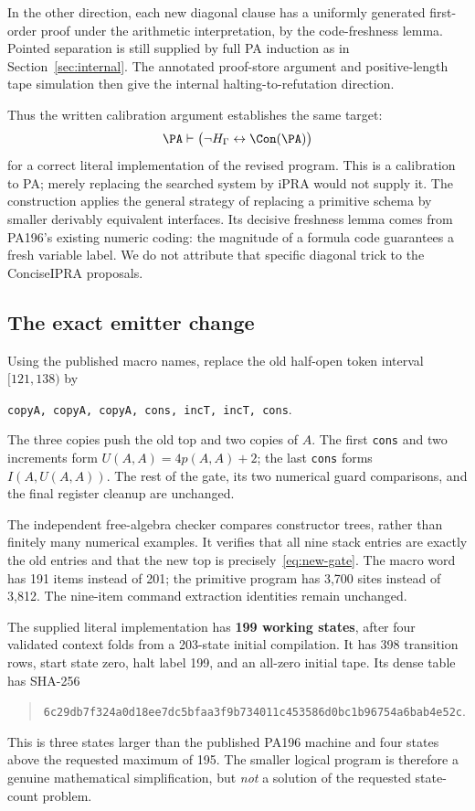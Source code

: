 In the other direction, each new diagonal clause has a uniformly generated first-order proof under the arithmetic interpretation, by the code-freshness lemma. Pointed separation is still supplied by full PA induction as in Section~\ref{sec:internal}. The annotated proof-store argument and positive-length tape simulation then give the internal halting-to-refutation direction.

Thus the written calibration argument establishes the same target:
\[
 \PA\vdash\bigl(\neg H_{\Gamma}\leftrightarrow\Con(\PA)\bigr)
\]
for a correct literal implementation of the revised program. This is a calibration to PA; merely replacing the searched system by iPRA would not supply it. The construction applies the general strategy of replacing a primitive schema by smaller derivably equivalent interfaces. Its decisive freshness lemma comes from PA196's existing numeric coding: the magnitude of a formula code guarantees a fresh variable label. We do not attribute that specific diagonal trick to the ConciseIPRA proposals.

\subsection{The exact emitter change}
Using the published macro names, replace the old half-open token interval \([121,138)\) by
\begin{center}
\texttt{copyA, copyA, copyA, cons, incT, incT, cons}.
\end{center}
The three copies push the old top and two copies of \(A\). The first \texttt{cons} and two increments form \(U(A,A)=4p(A,A)+2\); the last \texttt{cons} forms \(I(A,U(A,A))\). The rest of the gate, its two numerical guard comparisons, and the final register cleanup are unchanged.

The independent free-algebra checker compares constructor trees, rather than finitely many numerical examples. It verifies that all nine stack entries are exactly the old entries and that the new top is precisely~\eqref{eq:new-gate}. The macro word has 191 items instead of 201; the primitive program has 3,700 sites instead of 3,812. The nine-item command extraction identities remain unchanged.

The supplied literal implementation has \textbf{199 working states}, after four validated context folds from a 203-state initial compilation. It has 398 transition rows, start state zero, halt label 199, and an all-zero initial tape. Its dense table has SHA-256
\begin{quote}\small\nolinkurl{6c29db7f324a0d18ee7dc5bfaa3f9b734011c453586d0bc1b96754a6bab4e52c}.\end{quote}
This is three states larger than the published PA196 machine and four states above the requested maximum of 195. The smaller logical program is therefore a genuine mathematical simplification, but \emph{not} a solution of the requested state-count problem.
